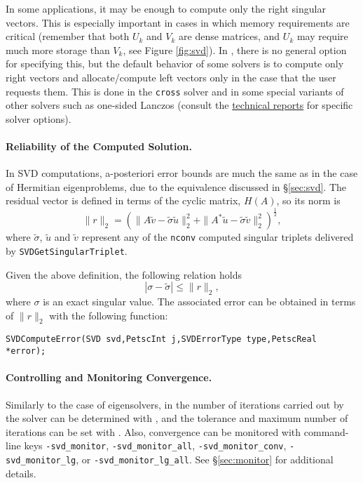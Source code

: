 In some applications, it may be enough to compute only the right singular vectors. This is especially important in cases in which memory requirements are critical (remember that both $U_k$ and $V_k$ are dense matrices, and $U_k$ may require much more storage than $V_k$, see Figure \ref{fig:svd}). In \slepc, there is no general option for specifying this, but the default behavior of some solvers is to compute only right vectors and allocate/compute left vectors only in the case that the user requests them. This is done in the \texttt{cross} solver and in some special variants of other solvers such as one-sided Lanczos (consult the \slepc \hyperlink{str}{technical reports} for specific solver options).

\paragraph{Reliability of the Computed Solution.}

In SVD computations, a-posteriori error bounds are much the same as in the case of Hermitian eigenproblems, due to the equivalence discussed in \S\ref{sec:svd}. The residual vector is defined in terms of the cyclic matrix, $H(A)$, so its norm is
\begin{equation}
\|r\|_2=\left(\|A\tilde{v}-\tilde{\sigma}\tilde{u}\|_2^2+\|A^*\tilde{u}-\tilde{\sigma}\tilde{v}\|_2^2\right)^{\frac{1}{2}},
\end{equation}
where $\tilde{\sigma}$, $\tilde{u}$ and $\tilde{v}$ represent any of the \texttt{nconv} computed singular triplets delivered by \texttt{SVDGetSingularTriplet}.

Given the above definition, the following relation holds
\begin{equation}
|\sigma-\tilde{\sigma}|\leq \|r\|_2,
\end{equation}
where $\sigma$ is an exact singular value. The associated error can be obtained in terms of $\|r\|_2$ with the following function:
	\begin{Verbatim}[fontsize=\small]
	SVDComputeError(SVD svd,PetscInt j,SVDErrorType type,PetscReal *error);
	\end{Verbatim}

\paragraph{Controlling and Monitoring Convergence.}

Similarly to the case of eigensolvers, in  the number of iterations carried out by the solver can be determined with , and the tolerance and maximum number of iterations can be set with . Also, convergence can be monitored with command-line keys \Verb!-svd_monitor!, \Verb!-svd_monitor_all!, \Verb!-svd_monitor_conv!, \Verb!-svd_monitor_lg!, or \Verb!-svd_monitor_lg_all!. See \S\ref{sec:monitor} for additional details.

